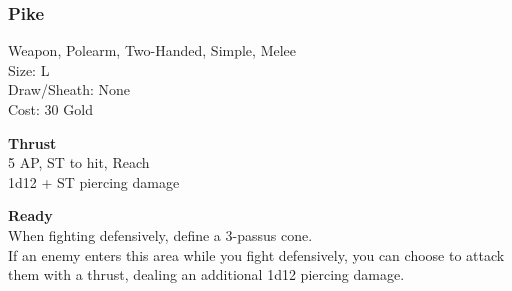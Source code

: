 \subsubsection{Pike}\label{weapon:pike}
Weapon, Polearm, Two-Handed, Simple, Melee\\
Size: L\\
Draw/Sheath: None\\
Cost: 30 Gold

\textbf{Thrust}\\
5 AP, ST to hit,  Reach\\
1d12 + \texttimes ST piercing damage

\textbf{Ready}\\
When fighting defensively, define a 3-passus cone.\\
If an enemy enters this area while you fight defensively, you can choose to attack them with a thrust, dealing an additional 1d12 piercing damage.\\

